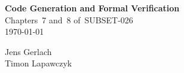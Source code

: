 \begin{titlepage}

\begin{center}
\begin{minipage}{0.6\textheight}
\centering
\vspace*{4cm} 
    
\Huge{\textbf{Code Generation and Formal Verification}} \\[1.0cm]
\large{Chapters~7 and~8 of~SUBSET-026} \\[1.2cm]

\Large{\today}\\[1.0cm]

\begin{large}
       Jens Gerlach\\
       Timon Lapawczyk\\[0.5cm]
\end{large}

\vspace*{3cm}
        

\end{minipage}
\end{center}
\end{titlepage}

